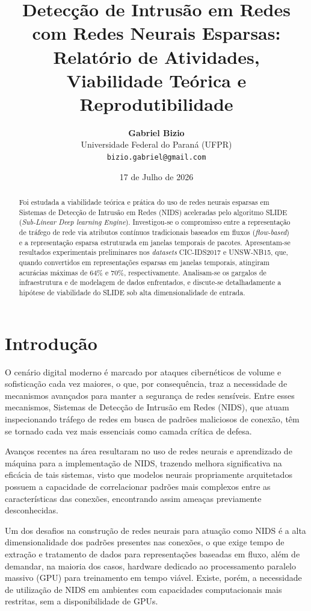 \documentclass[11pt,a4paper,oneside]{article}
\title{\textbf{Detecção de Intrusão em Redes com Redes Neurais Esparsas: Relatório de Atividades, Viabilidade Teórica e Reprodutibilidade}}
\author{\textbf{Gabriel Bizio} \\
Universidade Federal do Paraná (UFPR) \\
\texttt{bizio.gabriel@gmail.com}}
\date{17 de Julho de 2026}
\begin{document}
\maketitle

\begin{abstract}
Foi estudada a viabilidade teórica e prática do uso de redes neurais esparsas em Sistemas de Detecção de Intrusão em Redes (NIDS) aceleradas pelo algoritmo SLIDE (\textit{Sub-Linear Deep learning Engine}). Investigou-se o compromisso entre a representação de tráfego de rede via atributos contínuos tradicionais baseados em fluxos (\textit{flow-based}) e a representação esparsa estruturada em janelas temporais de pacotes. Apresentam-se resultados experimentais preliminares nos \textit{datasets} CIC-IDS2017 e UNSW-NB15, que, quando convertidos em representações esparsas em janelas temporais, atingiram acurácias máximas de 64\% e 70\%, respectivamente. Analisam-se os gargalos de infraestrutura e de modelagem de dados enfrentados, e discute-se detalhadamente a hipótese de viabilidade do SLIDE sob alta dimensionalidade de entrada.
\end{abstract}

\section{Introdução}
O cenário digital moderno é marcado por ataques cibernéticos de volume e sofisticação cada vez maiores, o que, por consequência, traz a necessidade de mecanismos avançados para manter a segurança de redes sensíveis. Entre esses mecanismos, Sistemas de Detecção de Intrusão em Redes (NIDS), que atuam inspecionando tráfego de redes em busca de padrões maliciosos de conexão, têm se tornado cada vez mais essenciais como camada crítica de defesa.

Avanços recentes na área resultaram no uso de redes neurais e aprendizado de máquina para a implementação de NIDS, trazendo melhora significativa na eficácia de tais sistemas, visto que modelos neurais propriamente arquitetados possuem a capacidade de correlacionar padrões mais complexos entre as características das conexões, encontrando assim ameaças previamente desconhecidas.

Um dos desafios na construção de redes neurais para atuação como NIDS é a alta dimensionalidade dos padrões presentes nas conexões, o que exige tempo de extração e tratamento de dados para representações baseadas em fluxo, além de demandar, na maioria dos casos, hardware dedicado ao processamento paralelo massivo (GPU) para treinamento em tempo viável. Existe, porém, a necessidade de utilização de NIDS em ambientes com capacidades computacionais mais restritas, sem a disponibilidade de GPUs.
\end{document}

